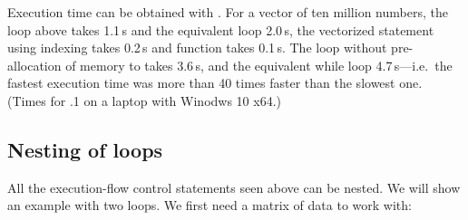 \documentclass[krantz2]{krantz}\usepackage{knitr}%
\begin{document}
\begin{explainbox}
\begin{knitrout}\footnotesize
{}\color{fgcolor}\begin{kframe}
\begin{alltt}
 \hlkwb{<-} \hlstd{a[}\hlopt{:}\hlstd{(a)]} \hlopt{-} \hlstd{a[}\hlopt{:}\hlopt{-}\hlstd{]}
\end{alltt}
\end{kframe}
\end{knitrout}

\begin{knitrout}\footnotesize
{}\color{fgcolor}\begin{kframe}
\begin{alltt}
 \hlkwb{<-} 
\end{alltt}
\end{kframe}
\end{knitrout}

Execution time can be obtained with . For a vector of ten million numbers, the  loop above takes 1.1\,s and the equivalent  loop 2.0\,s, the vectorized statement using indexing takes 0.2\,s and function  takes 0.1\,s. The  loop without pre-allocation of memory to  takes 3.6\,s, and the equivalent while loop 4.7\,s---i.e.\ the fastest execution time was more than 40 times faster than the slowest one. (Times for .1 on a laptop with Winodws 10 x64.)

\end{explainbox}

\subsection{Nesting of loops}\label{sec:nested:loops}

All the execution-flow control statements seen above can be nested. We will show an example with two  loops. We first need a matrix of data to work with:
\end{document}
